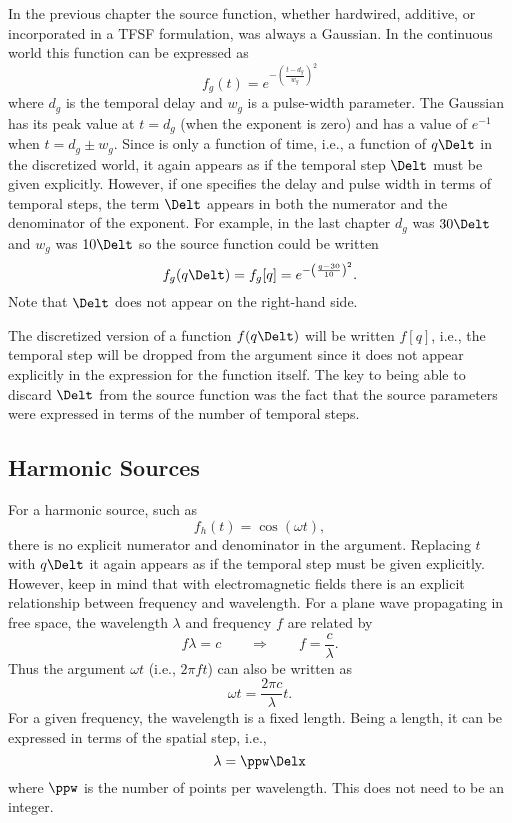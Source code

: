 In the previous chapter the source function, whether hardwired,
additive, or incorporated in a TFSF formulation, was always a
Gaussian.  In the continuous world this function can be expressed as
\begin{equation}
  f_g(t) = e^{-\left(\frac{t - d_g}{w_g}\right)^2}
  \label{eq:gaussianGeneric}
\end{equation}
where $d_g$ is the temporal delay and $w_g$ is a pulse-width
parameter.  The Gaussian has its peak value at $t=d_g$ (when the
exponent is zero) and has a value of $e^{-1}$ when $t=d_g\pm w_g$.
Since  is only a function of time, i.e., a
function of $q\Delt$ in the discretized world, it again appears as if
the temporal step $\Delt$ must be given explicitly.  However, if one
specifies the delay and pulse width in terms of temporal steps, the
term $\Delt$ appears in both the numerator and the denominator of the
exponent.  For example, in the last chapter $d_g$ was $30\Delt$ and
$w_g$ was $10\Delt$ so the source function could be written
\begin{equation}
   f_g(q\Delt) = f_g[q] = e^{-\left(\frac{q - 30}{10}\right)^2}.
\end{equation}
Note that $\Delt$ does not appear on the right-hand side.  

The discretized version of a function $f(q\Delt)$ will be written
$f[q]$, i.e., the temporal step will be dropped from the argument
since it does not appear explicitly in the expression for the function
itself.  The key to being able to discard $\Delt$ from the source
function was the fact that the source parameters were expressed in
terms of the number of temporal steps.

\subsection{Harmonic Sources \label{sec:harmonicSources}}

For a harmonic source, such as
\begin{equation}
  f_h(t)=\cos(\omega t),
\end{equation}
there is no explicit numerator and denominator in the argument.
Replacing $t$ with $q\Delt$ it again appears as if the temporal step
must be given explicitly.  However, keep in mind that with
electromagnetic fields there is an explicit relationship between
frequency and wavelength.  For a plane wave propagating in free space,
the wavelength $\lambda$ and frequency $f$ are related by
\begin{equation}
  f \lambda=c \qquad\Rightarrow \qquad f=\frac{c}{\lambda}.
\end{equation}
Thus the argument $\omega t$ (i.e., $2 \pi f t$) can also be written
as
\begin{equation}
  \omega t = \frac{2\pi c}{\lambda}t.
\end{equation}
For a given frequency, the wavelength is a fixed length.  Being a
length, it can be expressed in terms of the spatial step, i.e.,
\begin{equation}
  \lambda = \ppw \Delx
\end{equation}
where $\ppw$ is the number of points per wavelength.  This does not
need to be an integer.

